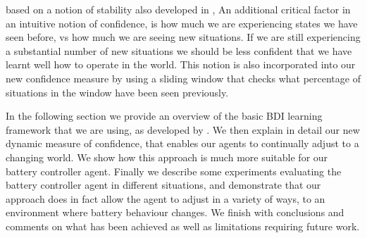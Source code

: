 based on a notion of stability also developed in 
\cite{airiau09:enhancing,singh10:learning},   An additional critical factor in
an intuitive notion of confidence, is how much we are experiencing
states we have seen before, vs how much we are seeing new
situations. If we are still experiencing a substantial number of new
situations we should be less confident that we have learnt well how to
operate in the world. This notion is also incorporated into our new
confidence measure by using a sliding window that checks what
percentage of situations in the window have been seen previously.

In the following section we provide an overview of the basic BDI
learning framework that we are using, as developed by 
\cite{airiau09:enhancing,singh10:extending,singh10:learning}. We then
explain in detail our new dynamic measure of confidence, that enables
our agents to continually adjust to a changing world. We show how this
approach is much more suitable for our battery controller
agent. Finally we describe some experiments evaluating the battery
controller agent in different situations, and demonstrate that our
approach does in fact allow the agent to adjust in a variety of ways,
to an environment where battery behaviour changes. We finish with
conclusions and comments on what has been achieved as well as
limitations requiring future work.
